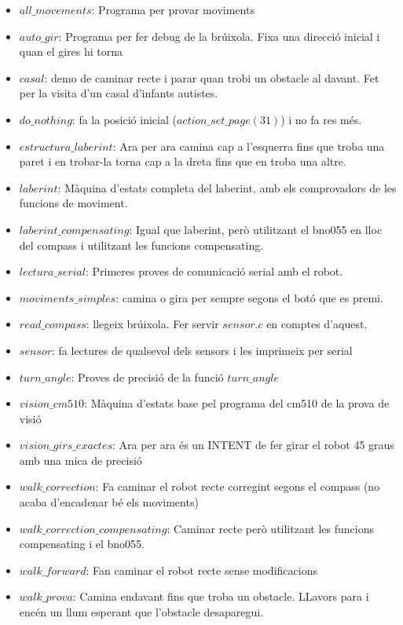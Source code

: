 \documentclass{article}
\begin{document}
\begin{itemize}

\item $all\_movements$: Programa per provar moviments
\item $auto\_gir$: Programa per fer debug de la brúixola. Fixa una direcció inicial i quan el gires hi torna
\item $casal$: demo de caminar recte i  parar quan trobi un obstacle al davant. Fet per la visita d'un casal d'infants autistes.
\item $do\_nothing$: fa la posició inicial ($action\_set\_page(31)$) i no fa res més.
\item $estructura\_laberint$: Ara per ara camina cap a l'esquerra fins que troba una paret i en trobar-la torna cap a la dreta fins que en troba una altre.  
\item $laberint$: Màquina d'estats completa del laberint, amb els comprovadors de les funcions de moviment.
\item $laberint\_compensating$: Igual que laberint, però utilitzant el bno055 en lloc del compass i utilitzant les funcions compensating.
\item $lectura\_serial$: Primeres proves de comunicació serial amb el robot.
\item $moviments\_simples$: camina o gira per sempre segons el botó que es premi.  
\item $read\_compass$: llegeix brúixola. Fer servir $sensor.c$ en comptes d'aquest.
\item $sensor$: fa lectures de qualsevol dels sensors i les imprimeix per serial
\item $turn\_angle$: Proves de precisió de la funció $turn\_angle$
\item $vision\_cm510$: Màquina d'estats base pel programa del cm510 de la prova de visió
\item $vision\_girs\_exactes$: Ara per ara és un INTENT de fer girar el robot 45 graus amb una mica de precisió
\item $walk\_correction$: Fa caminar el robot recte corregint segons el compass (no acaba d'encadenar bé els moviments)
\item $walk\_correction\_compensating$: Caminar recte però utilitzant les funcions compensating i el bno055.
\item $walk\_forward$: Fan caminar el robot recte sense modificacions
\item $walk\_prova$: Camina endavant fins que troba un obstacle. LLavors para i encén un llum esperant que l'obstacle desaparegui.
\end{itemize}
\end{document}
